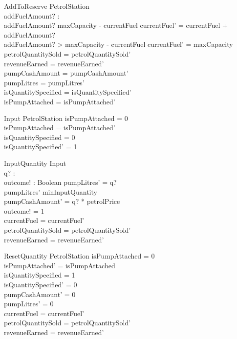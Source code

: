 \begin{schema}{AddToReserve}
\Delta PetrolStation \\
addFuelAmount? : \nat \\
\where
addFuelAmount? \leq maxCapacity - currentFuel  \implies currentFuel' = currentFuel + addFuelAmount? \\  
addFuelAmount? > maxCapacity - currentFuel \implies currentFuel' = maxCapacity \\
petrolQuantitySold = petrolQuantitySold' \\
revenueEarned = revenueEarned' \\
pumpCashAmount = pumpCashAmount' \\
pumpLitres = pumpLitres' \\
isQuantitySpecified = isQuantitySpecified' \\
isPumpAttached = isPumpAttached' \\
\end{schema}

\begin{schema}{Input}
\Delta PetrolStation
\where
isPumpAttached = 0 \\
isPumpAttached = isPumpAttached'\\
isQuantitySpecified = 0 \\
isQuantitySpecified' = 1 \\
\end{schema}

\begin{schema}{InputQuantity}
Input \\
q? : \nat \\
outcome! : Boolean 
\where
pumpLitres' = q? \\
pumpLitres' \geq minInputQuantity \\
pumpCashAmount' = q? * petrolPrice \\
outcome! = 1 \\
currentFuel = currentFuel' \\
petrolQuantitySold = petrolQuantitySold' \\
revenueEarned = revenueEarned' \\
\end{schema}

\begin{schema}{ResetQuantity}
\Delta PetrolStation
\where
isPumpAttached = 0 \\
isPumpAttached' = isPumpAttached \\
isQuantitySpecified = 1 \\
isQuantitySpecified' = 0 \\
pumpCashAmount' = 0 \\
pumpLitres' = 0 \\
currentFuel = currentFuel' \\
petrolQuantitySold = petrolQuantitySold' \\
revenueEarned = revenueEarned'
\end{schema}

